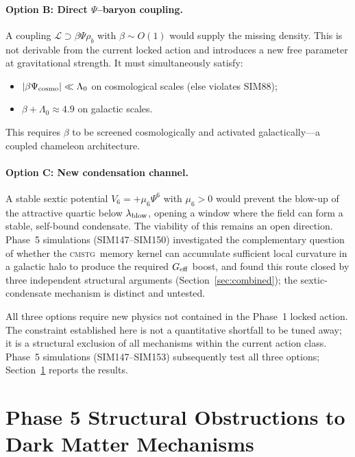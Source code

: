 \documentclass[12pt,a4paper]{article}
\newcommand{\CMSTG}{\textsc{cmstg}}
\newcommand{\Lz}{\Lambda_0}
\newcommand{\Geff}{G_{\rm eff}}
\theoremstyle{plain}
\begin{document}
\paragraph{Option B: Direct $\Psi$--baryon coupling.}
A coupling $\mathcal{L} \supset \beta\Psi\rho_b$ with $\beta \sim O(1)$
would supply the missing density. This is not derivable from the current
locked action and introduces a new free parameter at gravitational
strength. It must simultaneously satisfy:
\begin{itemize}
  \item $|\beta\Psi_{\rm cosmo}| \ll \Lz$ on cosmological scales (else
        violates SIM88);
  \item $\beta + \Lz \approx 4.9$ on galactic scales.
\end{itemize}
This requires $\beta$ to be screened cosmologically and activated
galactically---a coupled chameleon architecture.

\paragraph{Option C: New condensation channel.}
A stable sextic potential $V_6 = +\mu_6\Psi^6$ with $\mu_6 > 0$ would
prevent the blow-up of the attractive quartic below $\lambda_{\rm blow}$,
opening a window where the field can form a stable, self-bound condensate.
The viability of this remains an open direction. Phase~5 simulations
(SIM147--SIM150) investigated the complementary question of whether the
\CMSTG\ memory kernel can accumulate sufficient local curvature in a galactic
halo to produce the required $\Geff$ boost, and found this route closed by
three independent structural arguments (Section~\ref{sec:combined}); the
sextic-condensate mechanism is distinct and untested.

All three options require new physics not contained in the Phase~1 locked
action. The constraint established here is not a quantitative shortfall
to be tuned away; it is a structural exclusion of all mechanisms within
the current action class. Phase~5 simulations (SIM147--SIM153) subsequently
test all three options; Section~\ref{sec:phase5} reports the results.

\section{Phase 5 Structural Obstructions to Dark Matter Mechanisms}
\label{sec:phase5}
\end{document}
